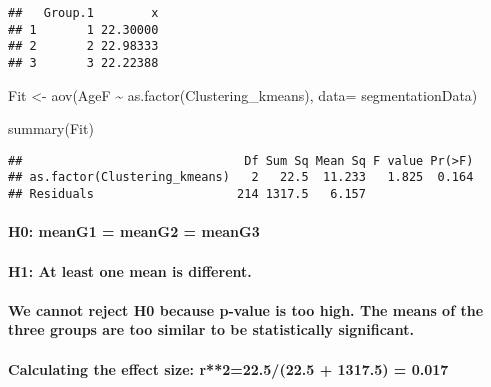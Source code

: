 \documentclass[
]{article}
\newenvironment{Shaded}{\begin{snugshade}}{\end{snugshade}}
\newcommand{\AttributeTok}[1]{\textcolor[rgb]{0.77,0.63,0.00}{#1}}
\newcommand{\FunctionTok}[1]{\textcolor[rgb]{0.00,0.00,0.00}{#1}}
\newcommand{\NormalTok}[1]{#1}
\newcommand{\OtherTok}[1]{\textcolor[rgb]{0.56,0.35,0.01}{#1}}
\newcommand{\SpecialCharTok}[1]{\textcolor[rgb]{0.00,0.00,0.00}{#1}}
\begin{document}
\begin{verbatim}
##   Group.1        x
## 1       1 22.30000
## 2       2 22.98333
## 3       3 22.22388
\end{verbatim}

\begin{Shaded}
\begin{Highlighting}[]
\NormalTok{Fit }\OtherTok{\textless{}{-}} \FunctionTok{aov}\NormalTok{(AgeF }\SpecialCharTok{\textasciitilde{}} \FunctionTok{as.factor}\NormalTok{(Clustering\_kmeans), }\AttributeTok{data=}\NormalTok{ segmentationData)}

\FunctionTok{summary}\NormalTok{(Fit)}
\end{Highlighting}
\end{Shaded}

\begin{verbatim}
##                               Df Sum Sq Mean Sq F value Pr(>F)
## as.factor(Clustering_kmeans)   2   22.5  11.233   1.825  0.164
## Residuals                    214 1317.5   6.157
\end{verbatim}

\hypertarget{h0-meang1-meang2-meang3}{%
\paragraph{H0: meanG1 = meanG2 = meanG3}\label{h0-meang1-meang2-meang3}}

\hypertarget{h1-at-least-one-mean-is-different.}{%
\paragraph{H1: At least one mean is
different.}\label{h1-at-least-one-mean-is-different.}}

\hypertarget{we-cannot-reject-h0-because-p-value-is-too-high.-the-means-of-the-three-groups-are-too-similar-to-be-statistically-significant.}{%
\paragraph{We cannot reject H0 because p-value is too high. The means of
the three groups are too similar to be statistically
significant.}\label{we-cannot-reject-h0-because-p-value-is-too-high.-the-means-of-the-three-groups-are-too-similar-to-be-statistically-significant.}}

\hypertarget{calculating-the-effect-size-r222.522.5-1317.5-0.017}{%
\paragraph{Calculating the effect size: r**2=22.5/(22.5 + 1317.5) =
0.017}\label{calculating-the-effect-size-r222.522.5-1317.5-0.017}}
\end{document}
